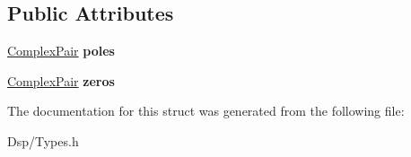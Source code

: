 \subsection*{Public Attributes}
\begin{DoxyCompactItemize}
\item 
\hypertarget{structDsp_1_1PoleZeroPair_accbc245aa7454ac6af8f1c1f79d44a67}{\hyperlink{structDsp_1_1ComplexPair}{Complex\-Pair} {\bfseries poles}}\label{structDsp_1_1PoleZeroPair_accbc245aa7454ac6af8f1c1f79d44a67}

\item 
\hypertarget{structDsp_1_1PoleZeroPair_a0add1c14ab3dfb75c8a9e7f6f165ff63}{\hyperlink{structDsp_1_1ComplexPair}{Complex\-Pair} {\bfseries zeros}}\label{structDsp_1_1PoleZeroPair_a0add1c14ab3dfb75c8a9e7f6f165ff63}

\end{DoxyCompactItemize}


The documentation for this struct was generated from the following file\-:\begin{DoxyCompactItemize}
\item 
Dsp/Types.\-h\end{DoxyCompactItemize}
